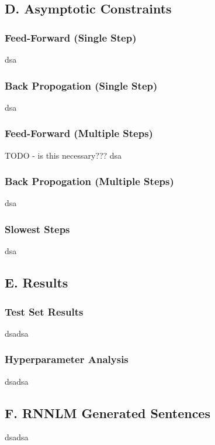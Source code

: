 \documentclass{article}
\begin{document}
\subsection*{D. Asymptotic Constraints}
\subsubsection*{Feed-Forward (Single Step)}
dsa

\subsubsection*{Back Propogation (Single Step)}
dsa

\subsubsection*{Feed-Forward (Multiple Steps)}
TODO - is this necessary??? dsa

\subsubsection*{Back Propogation (Multiple Steps)}
dsa

\subsubsection*{Slowest Steps}
dsa


\subsection*{E. Results}
\subsubsection*{Test Set Results}
dsadsa

\subsubsection*{Hyperparameter Analysis}
dsadsa


\subsection*{F. \textbf{RNNLM} Generated Sentences }
dsadsa
\end{document}
